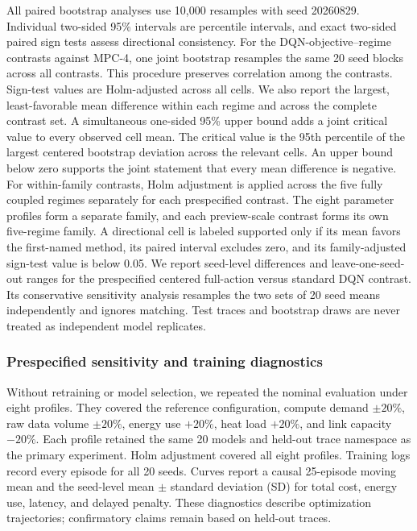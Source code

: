 \documentclass[remotesensing,article,submit,moreauthors]{Definitions/mdpi}
\begin{document}
All paired bootstrap analyses use 10,000 resamples with seed 20260829. Individual two-sided 95\% intervals are percentile intervals, and exact two-sided paired sign tests assess directional consistency. For the \DQNvsMPCContrastCount{} DQN-objective--regime contrasts against MPC-4, one joint bootstrap resamples the same 20 seed blocks across all contrasts. This procedure preserves correlation among the contrasts. Sign-test values are Holm-adjusted across all cells. We also report the largest, least-favorable mean difference within each regime and across the complete contrast set. A simultaneous one-sided 95\% upper bound adds a joint critical value to every observed cell mean. The critical value is the 95th percentile of the largest centered bootstrap deviation across the relevant cells. An upper bound below zero supports the joint statement that every mean difference is negative. For within-family contrasts, Holm adjustment is applied across the five fully coupled regimes separately for each prespecified contrast. The eight parameter profiles form a separate family, and each preview-scale contrast forms its own five-regime family. A directional cell is labeled supported only if its mean favors the first-named method, its paired interval excludes zero, and its family-adjusted sign-test value is below 0.05. We report seed-level differences and leave-one-seed-out ranges for the prespecified centered full-action versus standard DQN contrast. Its conservative sensitivity analysis resamples the two sets of 20 seed means independently and ignores matching. Test traces and bootstrap draws are never treated as independent model replicates.

\subsubsection{Prespecified sensitivity and training diagnostics}

Without retraining or model selection, we repeated the nominal evaluation under eight profiles. They covered the reference configuration, compute demand $\pm20\%$, raw data volume $\pm20\%$, energy use $+20\%$, heat load $+20\%$, and link capacity $-20\%$. Each profile retained the same 20 models and held-out trace namespace as the primary experiment. Holm adjustment covered all eight profiles. Training logs record every episode for all 20 seeds. Curves report a causal 25-episode moving mean and the seed-level mean $\pm$ standard deviation (SD) for total cost, energy use, latency, and delayed penalty. These diagnostics describe optimization trajectories; confirmatory claims remain based on held-out traces.
\end{document}
